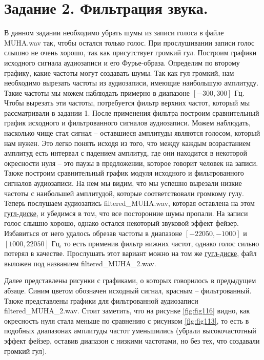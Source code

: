 \documentclass[a4paper, 12pt]{article}
\begin{document}
    \section{Задание 2. Фильтрация звука.}
    В данном задании необходимо убрать шумы из записи голоса в файле MUHA.wav так, чтобы остался только голос. 
    При прослушивании записи голос слышно не очень хорошо, так как присутствует громкий гул. Построим графики
    исходного сигнала аудиозаписи и его Фурье-образа. Определим по второму графику, какие частоты могут создавать
    шумы. Так как гул громкий, нам необходимо вырезать частоты из аудиозаписи, имеющие наибольшую амплитуду. Такие частоты мы можем
    наблюдать примерно в диапазоне $[-300,300]$ Гц. Чтобы вырезать эти частоты, потребуется фильтр верхних частот, который
    мы рассматривали в задании 1. После применения фильтра построим сравнительный график исходного и фильтрованного
    сигналов аудиозаписи. Можем наблюдать, насколько чище стал сигнал -- оставшиеся амплитуды являются голосом, который 
    нам нужен. Это легко понять исходя из того, что между каждым возрастанием амплитуд есть интервал с падением амплитуд, 
    где они находится в некоторой окресности нуля -- это паузы в предложении, которое говорит человек на записи. Также построим
    сравнительный график модуля исходного и фильтрованного сигналов аудиозаписи. На нем мы видим, что мы успешно вырезали
    низкие частоты с наибольшей амплитудой, которые соответствовали громкому гулу. Теперь послушаем аудиозапись filtered\_{MUHA}.wav, которая 
    оставлена на этом \href{https://drive.google.com/drive/folders/1AuXIiKRWvXFOtJqV3uqPzC494zZ7vCrd?usp=sharing}{гугл-диске}, 
    и убедимся в том, что все посторонние шумы пропали. На записи голос слышно хорошо, однако остался некоторый звуковой эффект 
    фейзер. Избавиться от него удалось обрезав частоты в диапазоне $[-22050, -1000]$ и $[1000, 22050]$ Гц, то есть применив фильтр нижних частот,
    однако голос сильно потерял в качестве. Прослушать этот вариант можно на том же
    \href{https://drive.google.com/drive/folders/1AuXIiKRWvXFOtJqV3uqPzC494zZ7vCrd?usp=sharing}{гугл-диске},
    файл выложен под названием filtered\_{MUHA}\_{2}.wav.


    Далее представлены рисунки с графиками, о которых говорилось в предыдущем абзаце. Синим цветом обозначен исходный сигнал,
    красным -- фильтрованный. Также представлены графики для фильтрованной аудиозаписи filtered\_{MUHA}\_{2}.wav. Стоит заметить,
    что на рисунке \ref{fig:fig116} видно, как окресность нуля стала меньше по сравнению с рисунком \ref{fig:fig113}, то есть в 
    подобных диапазонах амплитуды частот уменьшились (убрали высокочастотный эффект фейзер, оставив диапазон с низкими частотами, но
    без тех, что создавали громкий гул).
\end{document}
